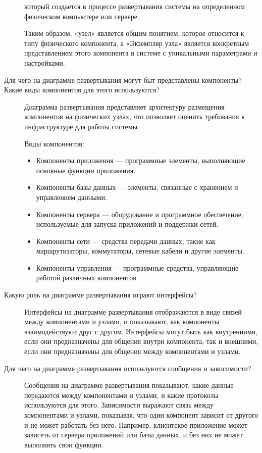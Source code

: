 \begin{description}
		который создается в процессе развертывания системы на определенном
		физическом компьютере или сервере. \par
		Таким образом, «узел» является общим понятием, которое относится
		к типу физического компонента, а «Экземпляр узла» является конкретным
		представлением этого компонента в системе с уникальными параметрами
		и настройками.
	\item [Для чего на диаграмме развертывания могут быт представлены
		компоненты? Какие виды компонентов для этого используются?]
		Диаграмма развертывания представляет архитектуру размещения
		компонентов на физических узлах, что позволяет оценить требования к
		инфраструктуре для работы системы.\par
		Виды компонентов:
		\begin{itemize}
			\item Компоненты приложения --- программные элементы,
				выполняющие основные функции приложения.
			\item Компоненты базы данных --- элементы,
				связанные с хранением и управлением данными.
			\item Компоненты сервера --- оборудование и программное
				обеспечение, используемые для запуска приложений
				и поддержки сетей.
			\item Компоненты сети --- средства передачи данных,
				такие как маршрутизаторы, коммутаторы,
				сетевые кабели и другие элементы.
			\item Компоненты управления --- программные средства,
				управляющие работой различных компонентов.
		\end{itemize}
	\item [Какую роль на диаграмме развертывания играют интерфейсы?]
		Интерфейсы на диаграмме развертывания отображаются в виде связей
		между компонентами и узлами, и показывают, как компоненты
		взаимодействуют друг с другом.
		Интерфейсы могут быть как внутренними, если они
		предназначены для общения внутри компонента, так и внешними, если они
		предназначены для общения между компонентами и узлами.
	\item [Для чего на диаграмме развертывания используются сообщения и
		зависимости?]
		Сообщения на диаграмме развертывания показывают,
		какие данные передаются между компонентами и узлами,
		и какие протоколы используются для этого.
		Зависимости выражают связь между компонентами и узлами, показывая,
		что один компонент зависит от другого и не может работать без него.
		Например, клиентское приложение может зависеть от сервера приложений
		или базы данных, и без них не может выполнять свои функции.
\end{description}

